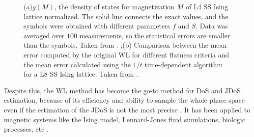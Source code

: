 
\begin{figure}[ht]
\centering
{}
\quad
{}

\caption{(a)$g(M)$, the density of states for magnetization $M$ of L4 SS Ising lattice normalized. The solid line connects the exact values, and the symbols were obtained with different parameters $f$ and $S$. Data was averaged over $100$ measurements, so the statistical errors are smaller than the symbols. Taken from \cite{Zhou2005}. ;(b) Comparison between the mean error computed by the original WL for different flatness criteria and the mean error calculated using the $1/t$ time-dependent algorithm for a L8 SS Ising lattice. Taken from \cite{Belardinelli2007}.}

\end{figure}


Despite this, the WL method has become the go-to method for DoS and JDoS estimation, because of its efficiency and ability to sample the whole phase space even if the estimation of the JDoS is not the most precise \cite{Zhou2005, Belardinelli2007}. It has been applied to magnetic systems like the Ising model, Lennard-Jones fluid simulations, biologic processes, etc \cite{Maerzke2014, Yan2002,Yan2003}.












